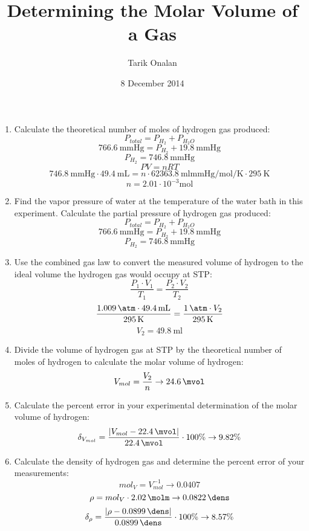 \documentclass{article}
\title{Determining the Molar Volume of a Gas}
\date{8 December 2014}
\author{Tarik Onalan}
\def\abs#1{\left| #1 \right|}
\begin{document}
    \maketitle
    \begin{enumerate}
        \item Calculate the theoretical number of moles of hydrogen gas produced:\\
            \[P_{total}=P_{H_{2}}+P_{H_{2}O}\]
            \[\SI{766.6}{\mmHg}=P_{H_{2}}+\SI{19.8}{\mmHg}\]
            \[P_{H_{2}}=\SI{746.8}{\mmHg}\]
            \[PV=nRT\]
            \[\SI{746.8}{\mmHg} \cdot \SI{49.4}{\mL}=n \cdot \SI{62363.8}
                {\ml\mmHg\per\mol\per\K}\cdot\SI{295}{\K}\]
            \[n=2.01 \cdot 10^{-3}\si{\mol}\]
        \item Find the vapor pressure of water at the temperature of the water bath
            in this experiment. Calculate the partial pressure of hydrogen gas produced:\\
            \[P_{total}=P_{H_{2}}+P_{H_{2}O}\]
            \[\SI{766.6}{\mmHg}=P_{H_{2}}+\SI{19.8}{\mmHg}\]
            \[P_{H_{2}}=\SI{746.8}{\mmHg}\]
        \item Use the combined gas law to convert the measured volume of hydrogen to
            the ideal volume the hydrogen gas would occupy at STP:
            \[\frac{P_{1} \cdot V_{1}}{T_{1}} = \frac{P_{2} \cdot V_{2}}{T_{2}}\]
            \[\frac{\SI{1.009}{\atm} \cdot \SI{49.4}{\ml}}{\SI{295}{\K}}=
                \frac{\SI{1}{\atm} \cdot V_{2}}{\SI{295}{\K}}\]
            \[V_{2}=\SI{49.8}{\ml}\]
        \item Divide the volume of hydrogen gas at STP by the theoretical number
            of moles of hydrogen to calculate the molar volume of hydrogen:
            \[V_{mol}=\frac{V_{2}}{n} \to \SI{24.6}{\mvol}\]
        \item Calculate the percent error in your experimental determination of
            the molar volume of hydrogen:
            \[\delta_{V_{mol}}=\frac{\abs{V_{mol}-\SI{22.4}{\mvol}}}
                {\SI{22.4}{\mvol}} \cdot 100\% \to 9.82\%\]
        \item Calculate the density of hydrogen gas and determine the percent error
            of your measurements:\\
            \[mol_{V}=V^{-1}_{mol} \to 0.0407\]
            \[\rho=mol_{V} \cdot \SI{2.02}{\molm} \to \SI{0.0822}{\dens}\]
            \[\delta_{\rho}=\frac{\abs{\rho-\SI{0.0899}{\dens}}}{\SI{0.0899}{\dens}}
                \cdot 100\% \to 8.57\%\]

\end{enumerate}
\end{document}
